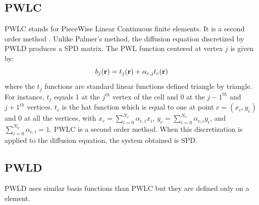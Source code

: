 \subsection{PWLC}
PWLC stands for PieceWise Linear Continuous finite elements. It is a second
order method \cite{Bailey2008}. Unlike Palmer's method, the diffusion equation
discretized by PWLD produces a SPD matrix. The PWL function centered at vertex
$j$ is given by:
\begin{equation}
  b_j(\mathbf{r}) = t_j(\mathbf{r}) + \alpha_{c,j} t_c(\mathbf{r})
\end{equation}
where the $t_j$ functions are standard linear functions defined triangle by
triangle. For instance, $t_ j$ equals 1 at the $j^{th}$ vertex of the cell and
0 at the $j-1^{th}$ and $j+1^{th}$ vertices. $t_c$ is the hat function which
is equal to one at point $c=(x_c,y_c)$ and 0 at all the vertices, with $x_c =
\sum_{i=0}^{N_v} \alpha_{c,i} x_i$, $y_c = \sum_{i=0}^{N_v} \alpha_{c,i} y_i$,
and $\sum_{i=0}^{N_V} \alpha_{c,i} = 1$. PWLC is a second order method. When
this discretization is applied to the diffusion equation, the system obtained
is SPD.
\subsection{PWLD}
PWLD uses similar basis functions than PWLC but they are defined only on a
element.
